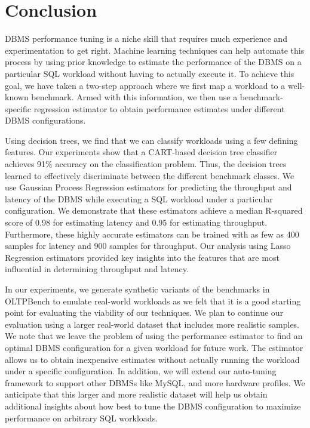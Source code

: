 \section{Conclusion} \label{sec:conclusion}

DBMS performance tuning is a niche skill that requires much experience
and experimentation to get right. Machine learning techniques can help
automate this process by using prior knowledge to estimate the
performance of the DBMS on a particular SQL workload
without having to actually execute it.
To achieve this goal, we have taken a two-step approach where
we first map a workload to a well-known benchmark.
Armed with this information, we then use a benchmark-specific
regression estimator to obtain performance estimates
under different DBMS configurations.

Using decision trees, we find that we can classify workloads
using a few defining features.
Our experiments show that a CART-based decision tree classifier
achieves 91\% accuracy on the classification problem.
Thus, the decision trees learned to effectively discriminate
between the different benchmark classes.
We use Gaussian Process Regression estimators for predicting
the throughput and latency of the DBMS while executing a
SQL workload under a particular configuration.
We demonstrate that these estimators achieve a median R-squared score
of 0.98 for estimating latency and 0.95 for estimating throughput.
Furthermore, these highly accurate estimators can be trained
with as few as 400 samples for latency and 900 samples for throughput.
Our analysis using Lasso Regression estimators provided key
insights into the features that are most influential in
determining throughput and latency.

In our experiments, we generate synthetic variants of the
benchmarks in OLTPBench to emulate real-world workloads as
we felt that it is a good starting point for evaluating the
viability of our techniques.
We plan to continue our evaluation using a larger real-world
dataset that includes more realistic samples.
We note that we leave the problem of using the performance
estimator to find an optimal DBMS configuration for a given
workload for future work. The estimator allows us to obtain
inexpensive estimates without actually running the workload
under a specific configuration.
In addition, we will extend our auto-tuning framework to
support other DBMSs like MySQL, and more hardware profiles.
We anticipate that this larger and more realistic dataset
will help us obtain additional insights about how best to
tune the DBMS configuration to maximize performance on
arbitrary SQL workloads.
